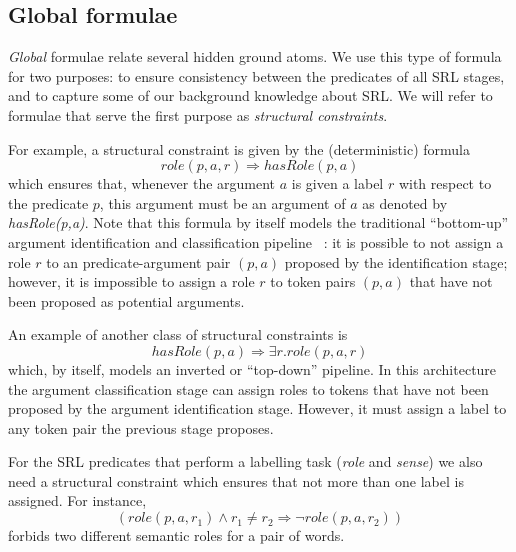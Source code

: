 \subsection{Global formulae}
\label{sec:global}

\emph{Global} formulae relate several hidden ground atoms. We use this type of formula for two purposes: to ensure consistency between the predicates of all SRL stages, and to capture some of our background knowledge about SRL. We will refer to formulae that serve the first purpose as \emph{structural constraints}. 

For example, a structural constraint is given by the (deterministic) formula
\[role(p,a,r) \Rightarrow hasRole(p,a)\]
which ensures that, whenever the argument $a$ is given a label $r$ with respect to the predicate $p$, this argument must be an argument of $a$ as denoted by \emph{hasRole(p,a)}. Note that this formula by itself models the traditional ``bottom-up'' argument identification and classification pipeline~ \citep{xue04calibrating}: it is possible to not assign a role $r$ to an predicate-argument pair $(p,a)$ proposed by the identification stage; however, it is impossible to assign a role $r$ to token pairs $(p,a)$ that have not been proposed as potential arguments.

An example of another class of structural constraints is 
\[
hasRole(p,a)\Rightarrow\exists r.role(p,a,r)
\]
which, by itself, models an inverted or ``top-down'' pipeline. In this architecture the argument classification stage can assign roles to tokens that have not been proposed by the argument identification stage. However, it must assign a label to any token pair the previous stage proposes. 


For the SRL predicates that perform a labelling task (\emph{role} and \emph{sense}) we also need a structural constraint which ensures that not more than one label is assigned. For instance,
\[
(role(p,a,r_1) \wedge r_1 \neq r_2 \Rightarrow \neg role(p,a,r_2)  )
\]
forbids two different semantic roles for a pair of words. 

